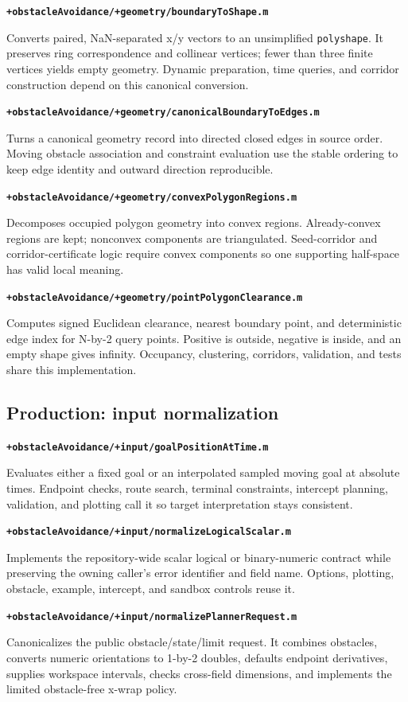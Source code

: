 \documentclass[10pt,letterpaper]{article}
\newcommand{\file}[1]{\nolinkurl{#1}}
\newcommand{\scriptentry}[2]{%
  \par\medskip\noindent\textbf{\file{#1}}\par
  \begingroup\raggedright #2\par\endgroup
}
\begin{document}
\scriptentry{+obstacleAvoidance/+geometry/boundaryToShape.m}{Converts paired,
NaN-separated x/y vectors to an unsimplified \file{polyshape}.
It preserves ring correspondence and collinear vertices; fewer than three
finite vertices yields empty geometry. Dynamic preparation, time queries, and
corridor construction depend on this canonical conversion.}

\scriptentry{+obstacleAvoidance/+geometry/canonicalBoundaryToEdges.m}{Turns a
canonical geometry record into directed closed edges in source order. Moving
obstacle association and constraint evaluation use the stable ordering to keep
edge identity and outward direction reproducible.}

\scriptentry{+obstacleAvoidance/+geometry/convexPolygonRegions.m}{Decomposes
occupied polygon geometry into convex regions. Already-convex regions are kept;
nonconvex components are triangulated. Seed-corridor and corridor-certificate
logic require convex components so one supporting half-space has valid local
meaning.}

\scriptentry{+obstacleAvoidance/+geometry/pointPolygonClearance.m}{Computes
signed Euclidean clearance, nearest boundary point, and deterministic edge
index for N-by-2 query points. Positive is outside, negative is inside, and an
empty shape gives infinity. Occupancy, clustering, corridors, validation, and
tests share this implementation.}

\subsection{Production: input normalization}

\scriptentry{+obstacleAvoidance/+input/goalPositionAtTime.m}{Evaluates either a
fixed goal or an interpolated sampled moving goal at absolute times. Endpoint
checks, route search, terminal constraints, intercept planning, validation, and
plotting call it so target interpretation stays consistent.}

\scriptentry{+obstacleAvoidance/+input/normalizeLogicalScalar.m}{Implements the
repository-wide scalar logical or binary-numeric contract while preserving the
owning caller's error identifier and field name. Options, plotting, obstacle,
example, intercept, and sandbox controls reuse it.}

\scriptentry{+obstacleAvoidance/+input/normalizePlannerRequest.m}{Canonicalizes
the public obstacle/state/limit request. It combines obstacles, converts numeric
orientations to 1-by-2 doubles, defaults endpoint derivatives, supplies
workspace intervals, checks cross-field dimensions, and implements the limited
obstacle-free x-wrap policy.}
\end{document}
